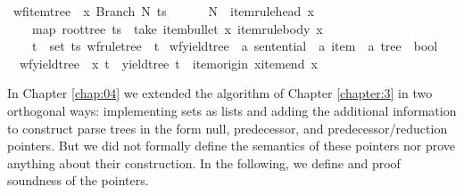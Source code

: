\begin{isabellebody}
{\isacharbar}{\kern0pt}\ {\isachardoublequoteopen}wf{\isacharunderscore}{\kern0pt}item{\isacharunderscore}{\kern0pt}tree\ {\isasymG}\ x\ {\isacharparenleft}{\kern0pt}Branch\ N\ ts{\isacharparenright}{\kern0pt}\ {\isasymlongleftrightarrow}\ {\isacharparenleft}{\kern0pt}\isanewline
\ \ \ \ N\ {\isacharequal}{\kern0pt}\ item{\isacharunderscore}{\kern0pt}rule{\isacharunderscore}{\kern0pt}head\ x\ {\isasymand}\isanewline
\ \ \ \ map\ root{\isacharunderscore}{\kern0pt}tree\ ts\ {\isacharequal}{\kern0pt}\ take\ {\isacharparenleft}{\kern0pt}item{\isacharunderscore}{\kern0pt}bullet\ x{\isacharparenright}{\kern0pt}\ {\isacharparenleft}{\kern0pt}item{\isacharunderscore}{\kern0pt}rule{\isacharunderscore}{\kern0pt}body\ x{\isacharparenright}{\kern0pt}\ {\isasymand}\isanewline
\ \ \ \ {\isacharparenleft}{\kern0pt}{\isasymforall}t\ {\isasymin}\ set\ ts{\isachardot}{\kern0pt}\ wf{\isacharunderscore}{\kern0pt}rule{\isacharunderscore}{\kern0pt}tree\ {\isasymG}\ t{\isacharparenright}{\kern0pt}{\isacharparenright}{\kern0pt}{\isachardoublequoteclose}\isanewline
\isanewline
{}\isamarkupfalse%
\ wf{\isacharunderscore}{\kern0pt}yield{\isacharunderscore}{\kern0pt}tree\ {\isacharcolon}{\kern0pt}{\isacharcolon}{\kern0pt}\ {\isachardoublequoteopen}{\isacharprime}{\kern0pt}a\ sentential\ {\isasymRightarrow}\ {\isacharprime}{\kern0pt}a\ item\ {\isasymRightarrow}\ {\isacharprime}{\kern0pt}a\ tree\ {\isasymRightarrow}\ bool{\isachardoublequoteclose}\ \isanewline
\ \ {\isachardoublequoteopen}wf{\isacharunderscore}{\kern0pt}yield{\isacharunderscore}{\kern0pt}tree\ {\isasymomega}\ x\ t\ {\isasymequiv}\ yield{\isacharunderscore}{\kern0pt}tree\ t\ {\isacharequal}{\kern0pt}\ {\isasymomega}{\isacharbrackleft}{\kern0pt}item{\isacharunderscore}{\kern0pt}origin\ x{\isachardot}{\kern0pt}{\isachardot}{\kern0pt}item{\isacharunderscore}{\kern0pt}end\ x{\isasymrangle}{\isachardoublequoteclose}%
\isadelimdocument
%
\endisadelimdocument
%
\isatagdocument
%
\isamarkuptrue%
%
\endisatagdocument
{\isafolddocument}%
%
\isadelimdocument
%
\endisadelimdocument
%
\begin{isamarkuptext}%
In Chapter \ref{chap:04} we extended the algorithm of Chapter \ref{chapter:3} in two orthogonal
ways: implementing sets as lists and adding the additional information to construct parse trees
in the form null, predecessor, and predecessor/reduction pointers. But we did not formally define
the semantics of these pointers nor prove anything about their construction. In the following, we
define and proof soundness of the pointers.


\end{isamarkuptext}
\end{isabellebody}
